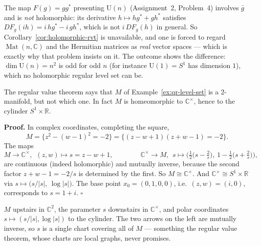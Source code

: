 \documentclass[11pt]{report}
\makeatletter
\newcounter{excounter}[section]
\renewenvironment{proof}[1][Proof]{\noindent\textbf{#1.} }{\hfill$\square$\par\vspace{5pt}}
\newcommand{\exlabel}[1]{\edef\@currentlabel{\arabic{section}.\arabic{excounter}}\label{#1}}
\newcommand{\Ugp}{\mathrm{U}}
\DeclareMathOperator{\Mat}{Mat}
\makeatother
\begin{document}
\begin{rembox}\label{rem:contrast-unitary-group}
The map $F(g) = gg^*$ presenting $\Ugp(n)$ (Assignment~2, Problem~4) involves $\bar g$ and is \emph{not} holomorphic: its derivative $h \mapsto hg^* + gh^*$ satisfies $DF_g(ih) = i\,hg^* - i\,gh^*$, which is not $i\,DF_g(h)$ in general. So Corollary~\ref{cor:holomorphic-rvt} is unavailable, and one is forced to regard $\Mat(n,\mathbb{C})$ and the Hermitian matrices as \emph{real} vector spaces --- which is exactly why that problem insists on it. The outcome shows the difference: $\dim \Ugp(n) = n^2$ is odd for odd $n$ (for instance $\Ugp(1) = S^1$ has dimension $1$), which no holomorphic regular level set can be.
\end{rembox}

\begin{exbox}\exlabel{ex:qr-cylinder}
The regular value theorem says that $M$ of Example~\ref{ex:qr-level-set} is a $2$-manifold, but not which one. In fact $M$ is homeomorphic to $\mathbb{C}^\times$, hence to the cylinder $S^1 \times \mathbb{R}$.
\end{exbox}

\begin{proof}
In complex coordinates, completing the square,
\[
M = \{z^2 - (w-1)^2 = -2\} = \{(z - w + 1)(z + w - 1) = -2\}.
\]
The maps
\[
M \to \mathbb{C}^\times,\ \ (z,w) \mapsto s = z - w + 1, \qquad\qquad
\mathbb{C}^\times \to M,\ \ s \mapsto \Big(\tfrac12\big(s - \tfrac{2}{s}\big),\ 1 - \tfrac12\big(s + \tfrac{2}{s}\big)\Big),
\]
are continuous (indeed holomorphic) and mutually inverse, because the second factor $z + w - 1 = -2/s$ is determined by the first. So $M \cong \mathbb{C}^\times$. And $\mathbb{C}^\times \cong S^1 \times \mathbb{R}$ via $s \mapsto \big(s/|s|,\ \log|s|\big)$. The base point $x_0 = (0,1,0,0)$, i.e.\ $(z,w) = (i,0)$, corresponds to $s = 1+i$.
\end{proof}

\begin{center}
\end{center}

$M$ upstairs in $\mathbb{C}^2$, the parameter $s$ downstairs in $\mathbb{C}^\times$, and polar coordinates $s \mapsto (s/|s|, \log|s|)$ to the cylinder. The two arrows on the left are mutually inverse, so $s$ is a single chart covering all of $M$ --- something the regular value theorem, whose charts are local graphs, never promises.
\end{document}

